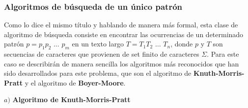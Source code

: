 \subsubsection{Algoritmos de búsqueda de un único patrón}
Como lo dice el mismo título y hablando de manera más formal, esta clase de algoritmo de búsqueda consiste en encontrar las ocurrencias de un determinado patrón\cite{stringmatching} $p=p_{1}p_{2}$ $\ldots$ $p_{m}$ en un texto largo $T=T_{1}T_{2}$ $\ldots$ $T_{n}$, donde $p$ y $T$ son secuencias de caracteres que provienen de set finito de caracteres $\Sigma$.
Para este caso se describirán de manera sencilla los algoritmos más reconocidos que han sido desarrollados para este problema, que son el algoritmo de \textbf{Knuth-Morris-Pratt} y el algoritmo de \textbf{Boyer-Moore}.

$a)$ \textbf{Algoritmo de Knuth-Morris-Pratt}

